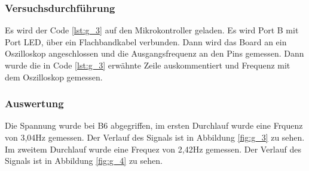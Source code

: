 \documentclass[12pt,a4paper]{article}
\begin{document}
\subsubsection*{Versuchsdurchführung}

Es wird der Code \ref{lst:g_3} auf den Mikrokontroller geladen. Es wird Port B mit Port LED, über ein Flachbandkabel verbunden. Dann wird das Board an ein Oszilloskop angeschlossen und die Ausgangsfrequenz an den Pins gemessen. Dann wurde die in Code \ref{lst:g_3} erwähnte Zeile auskommentiert und Frequenz mit dem  Oszilloskop gemessen.


\subsubsection*{Auswertung}

Die Spannung wurde bei B6 abgegriffen, im ersten Durchlauf wurde eine Frquenz von 3,04Hz gemessen. Der Verlauf des Signals ist in Abbildung \ref{fig:g_3} zu sehen. Im zweitem Durchlauf wurde eine Frequez von 2,42Hz gemessen. Der Verlauf des Signals ist in Abbildung \ref{fig:g_4} zu sehen.
\end{document}

